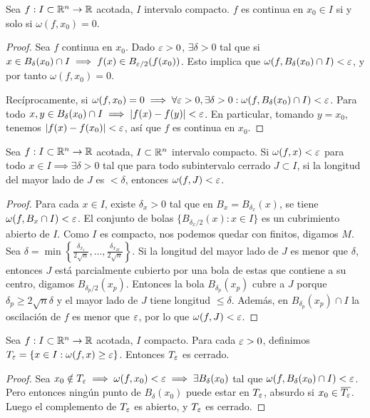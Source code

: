 \begin{theorem}
  Sea \(f: I \subset \mathbb{R}^n \to \mathbb{R}\) acotada, \(I\) intervalo compacto. \(f\) es continua en \(x_0 \in I\) si y solo si \(\omega(f, x_0) = 0\).
\end{theorem}
\begin{proof}
  Sea \(f\) continua en \(x_0\). Dado \(\varepsilon > 0\), \(\exists \delta > 0\) tal que si \(x \in B_\delta(x_0) \cap I \implies f(x) \in B_{\varepsilon/2}(f(x_0))\). Esto implica que \(\omega(f, B_\delta(x_0) \cap I) < \varepsilon\), y por tanto \(\omega(f, x_0) = 0\).

  Recíprocamente, si \(\omega(f, x_0) = 0 \implies \forall \varepsilon > 0, \exists \delta > 0 : \omega(f, B_\delta(x_0) \cap I) < \varepsilon\).
  Para todo \(x, y \in B_\delta(x_0) \cap I \implies |f(x) - f(y)| < \varepsilon\). En particular, tomando \(y = x_0\), tenemos \(|f(x) - f(x_0)| < \varepsilon\), así que \(f\) es continua en \(x_0\).
\end{proof}

\begin{theorem}
  Sea \(f: I \subset \mathbb{R}^n \to \mathbb{R}\) acotada, \(I \subset \mathbb{R}^n\) intervalo compacto. Si \(\omega(f, x) < \varepsilon\) para todo \(x \in I \implies \exists \delta > 0\) tal que para todo subintervalo cerrado \(J \subset I\), si la longitud del mayor lado de \(J\) es \(< \delta\), entonces \(\omega(f, J) < \varepsilon\).
\end{theorem}
\begin{proof}
  Para cada \(x \in I\), existe \(\delta_x > 0\) tal que en \(B_x = B_{\delta_x}(x)\), se tiene \(\omega(f, B_x \cap I) < \varepsilon\).
  El conjunto de bolas \(\{B_{\delta_x/2}(x) : x \in I\}\) es un cubrimiento abierto de \(I\). Como \(I\) es compacto, nos podemos quedar con finitos, digamos \(M\).
  Sea \(\delta = \min \left\{ \frac{\delta_{x_1}}{2\sqrt{n}}, \dots, \frac{\delta_{x_M}}{2\sqrt{n}} \right\}\).
  Si la longitud del mayor lado de \(J\) es menor que \(\delta\), entonces \(J\) está parcialmente cubierto por una bola de estas que contiene a su centro, digamos \(B_{\delta_p/2}(x_p)\).
  Entonces la bola \(B_{\delta_p}(x_p)\) cubre a \(J\) porque \(\delta_p \geq 2\sqrt{n}\delta\) y el mayor lado de \(J\) tiene longitud \(\leq \delta\). Además, en \(B_{\delta_p}(x_p) \cap I\) la oscilación de \(f\) es menor que \(\varepsilon\), por lo que \(\omega(f, J) < \varepsilon\).
\end{proof}

\begin{theorem}
  Sea \(f: I \subset \mathbb{R}^n \to \mathbb{R}\) acotada, \(I\) compacto. Para cada \(\varepsilon > 0\), definimos \(T_\varepsilon = \{x \in I : \omega(f, x) \geq \varepsilon\}\). Entonces \(T_\varepsilon\) es cerrado.
\end{theorem}
\begin{proof}
  Sea \(x_0 \notin T_\varepsilon \implies \omega(f, x_0) < \varepsilon \implies \exists B_\delta(x_0)\) tal que \(\omega(f, B_\delta(x_0) \cap I) < \varepsilon\).
  Pero entonces ningún punto de \(B_\delta(x_0)\) puede estar en \(T_\varepsilon\), absurdo si \(x_0 \in \overline{T_\varepsilon}\). Luego el complemento de \(T_\varepsilon\) es abierto, y \(T_\varepsilon\) es cerrado.
\end{proof}

